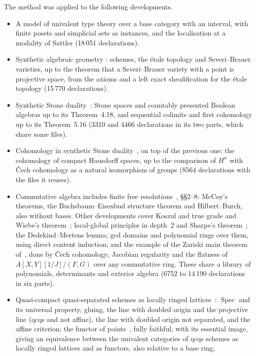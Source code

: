 \documentclass[11pt]{article}
\begin{document}
The method was applied to the following developments.
\begin{itemize}
\item A model of univalent type theory over a base category with an
  interval, with finite posets and simplicial sets as instances, and the
  localisation at a modality of Sattler (18\,051 declarations).
\item Synthetic algebraic geometry \cite{SAG}: schemes, the \'etale
  topology and Severi--Brauer varieties, up to the theorem that a
  Severi--Brauer variety with a point is projective space, from the
  axioms and a left exact sheafification for the \'etale
  topology (15\,770 declarations).
\item Synthetic Stone duality~\cite{SSD}: Stone spaces and countably
  presented Boolean algebras up to its Theorem~4.18, and sequential
  colimits and first cohomology up to its Theorem~5.16 (3310 and 4466
  declarations in its two parts, which share some files).
\item Cohomology in synthetic Stone duality~\cite{CCA}, on top of the
  previous one: the cohomology of compact Hausdorff spaces, up to the
  comparison of $H^n$ with \v{C}ech cohomology as a natural isomorphism
  of groups (8564 declarations with the files it reuses).
\item Commutative algebra includes finite free resolutions~\cite{CQ},
  \S\S2--8: McCoy's theorems, the Buchsbaum--Eisenbud structure theorem
  and Hilbert--Burch, also without bases. Other developments cover
  Koszul and true grade and Wiebe's
  theorem~\cite{CT}; local-global principles in depth~2 and Sharpe's
  theorem~\cite{CL}; the Dedekind--Mertens lemma; gcd domains and
  polynomial rings over them, using direct content induction; and the example of the Zariski main
  theorem of~\cite{ACL}, done by \v{C}ech cohomology; Jacobian
  regularity and the flatness of $A[X,Y][1/J]/(F,G)$ over any
  commutative ring. These share a library of polynomials, determinants
  and exterior algebra (6752 to 14\,190 declarations in six parts).
\item Quasi-compact quasi-separated schemes as locally ringed
  lattices~\cite{Zeu}: $\operatorname{Spec}$ and its universal property,
  gluing, the line with doubled origin and the projective line (qcqs and
  not affine), the line with doubled origin not separated, and the
  affine criterion; the functor of
  points~\cite{ZH}, fully faithful, with its essential image, giving an
  equivalence between the univalent categories of qcqs schemes as
  locally ringed lattices and as functors, also relative to a base ring;

\end{itemize}
\end{document}
